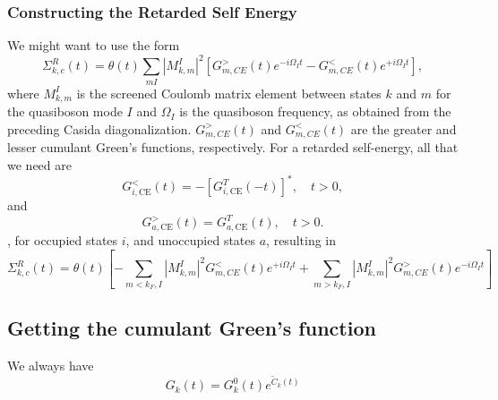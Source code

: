 \subsubsection{Constructing the Retarded Self Energy }
We might want to use the form
\begin{equation}
    \Sigma_{k, c}^R(t)=\theta(t) \sum_{m I}\left|M_{ k, m}^I\right|^2\left[G_{m,CE}^{>}(t) e^{-i \Omega_I t}-G_{m,CE}^{<}(t) e^{+i \Omega_I t}\right],
\end{equation}
where $M_{k, m}^I$ is the screened Coulomb matrix element between states $k$ and $m$ for the quasiboson mode $I$ and $\Omega_I$ is the quasiboson frequency, as obtained from the preceding Casida diagonalization. $G_{m,CE}^{>}(t)$ and $G_{m,CE}^{<}(t)$ are the greater and lesser cumulant Green's functions, respectively. For a retarded self-energy, all that we need are $$
G_{i, \mathrm{CE}}^{<}(t)=-\left[G_{i, \mathrm{CE}}^T(-t)\right]^*, \quad t>0,
$$
and
$$
G_{a, \mathrm{CE}}^{>}(t)=G_{a, \mathrm{CE}}^T(t), \quad t>0 .
$$, for occupied states $i$, and unoccupied states $a$,
resulting in
\begin{equation}
    \Sigma_{k, c}^R(t)=\theta(t)\left[-\sum_{m<k_F, I}\left|M_{ k, m}^I\right|^2 G_{m,CE}^{<}(t) e^{+i \Omega_I t} + \sum_{m>k_F, I}\left|M_{ k, m}^I\right|^2 G_{m,CE}^{>}(t) e^{-i \Omega_I t}\right]
\end{equation}
\subsection{Getting the cumulant Green's function }
We always have 
\begin{equation}
G_k(t)=G_k^{ 0}(t) e^{\tilde{C}_k(t)}
\end{equation}
